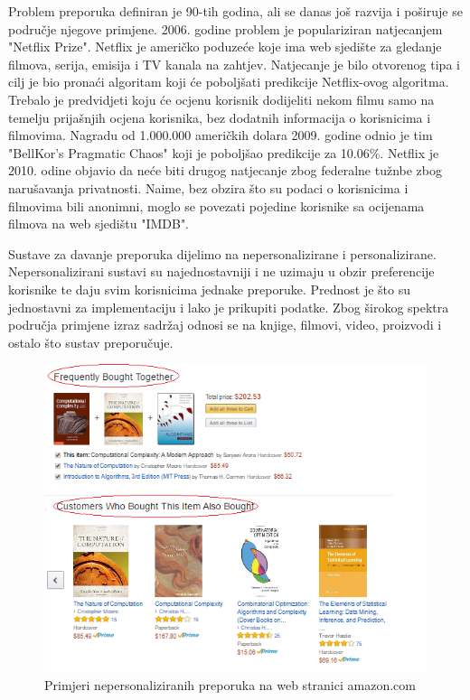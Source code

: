 \documentclass[a4paper,oneside,12pt]{memoir} %
\begin{document}
Problem preporuka definiran je 90-tih godina, ali se danas još razvija i poširuje se područje njegove primjene. 2006. godine problem je populariziran natjecanjem "Netflix Prize". Netflix je američko poduzeće koje ima web sjedište za gledanje filmova, serija, emisija i TV kanala na zahtjev. Natjecanje je bilo otvorenog tipa i cilj je bio pronaći algoritam koji će poboljšati predikcije Netflix-ovog algoritma. Trebalo je predvidjeti koju će ocjenu korisnik dodijeliti nekom filmu samo na temelju prijašnjih ocjena korisnika, bez dodatnih informacija o korisnicima i filmovima. Nagradu od 1.000.000 američkih dolara 2009. godine odnio je tim "BellKor's Pragmatic Chaos" koji je poboljšao predikcije za 10.06\%. Netflix je 2010. odine objavio da neće biti drugog natjecanje zbog federalne tužnbe zbog narušavanja privatnosti. Naime, bez obzira što su podaci o korisnicima i filmovima bili anonimni, moglo se povezati pojedine korisnike sa ocijenama filmova na web sjedištu "IMDB". 
\par
Sustave za davanje preporuka dijelimo na nepersonalizirane i personalizirane. Nepersonalizirani sustavi su najednostavniji i ne uzimaju u obzir preferencije korisnike te daju svim korisnicima jednake preporuke. Prednost je što su jednostavni za implementaciju i lako je prikupiti podatke. Zbog širokog spektra područja primjene izraz sadržaj odnosi se na knjige, filmovi, video, proizvodi i ostalo što sustav preporučuje.   
\begin{figure}[!h]
\begin{center}
\includegraphics[scale=1]{slike/amazon-non_personalized_recom.png}
\caption{Primjeri nepersonaliziranih preporuka na web stranici amazon.com}
\label{fig: amazon nepresonalizirane preporuke}
\end{center}
\end{figure}
\end{document}
